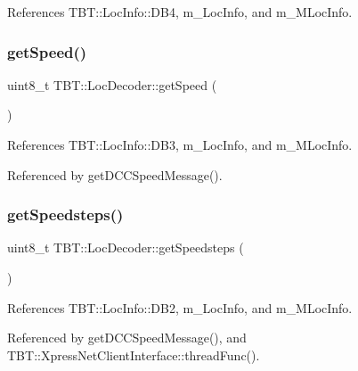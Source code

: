 References T\+B\+T\+::\+Loc\+Info\+::\+D\+B4, m\+\_\+\+Loc\+Info, and m\+\_\+\+M\+Loc\+Info.

\mbox{\label{classTBT_1_1LocDecoder_a7305c8ab02a76b48b2b5ab93f1aec24b_a7305c8ab02a76b48b2b5ab93f1aec24b}} 
\subsubsection{\texorpdfstring{get\+Speed()}{getSpeed()}}
{\footnotesize\ttfamily uint8\+\_\+t T\+B\+T\+::\+Loc\+Decoder\+::get\+Speed (\begin{DoxyParamCaption}{ }\end{DoxyParamCaption})\hspace{0.3cm}{\ttfamily [inline]}}



References T\+B\+T\+::\+Loc\+Info\+::\+D\+B3, m\+\_\+\+Loc\+Info, and m\+\_\+\+M\+Loc\+Info.



Referenced by get\+D\+C\+C\+Speed\+Message().

\mbox{\label{classTBT_1_1LocDecoder_ae89a770202444bca60595182fe4a9c90_ae89a770202444bca60595182fe4a9c90}} 
\subsubsection{\texorpdfstring{get\+Speedsteps()}{getSpeedsteps()}}
{\footnotesize\ttfamily uint8\+\_\+t T\+B\+T\+::\+Loc\+Decoder\+::get\+Speedsteps (\begin{DoxyParamCaption}{ }\end{DoxyParamCaption})\hspace{0.3cm}{\ttfamily [inline]}}



References T\+B\+T\+::\+Loc\+Info\+::\+D\+B2, m\+\_\+\+Loc\+Info, and m\+\_\+\+M\+Loc\+Info.



Referenced by get\+D\+C\+C\+Speed\+Message(), and T\+B\+T\+::\+Xpress\+Net\+Client\+Interface\+::thread\+Func().

